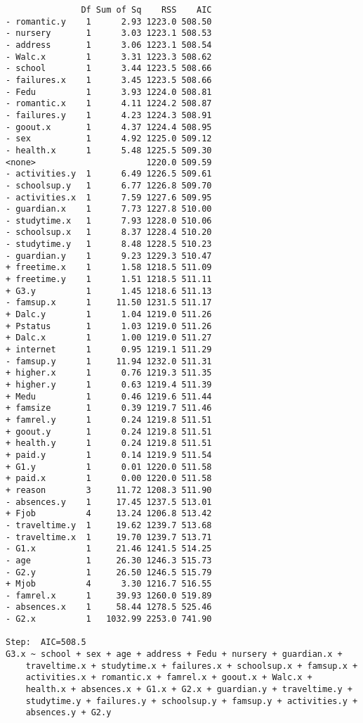 \documentclass[11pt]{article}
\begin{document}
\begin{enumerate}
\begin{verbatim}
               Df Sum of Sq    RSS    AIC
- romantic.y    1      2.93 1223.0 508.50
- nursery       1      3.03 1223.1 508.53
- address       1      3.06 1223.1 508.54
- Walc.x        1      3.31 1223.3 508.62
- school        1      3.44 1223.5 508.66
- failures.x    1      3.45 1223.5 508.66
- Fedu          1      3.93 1224.0 508.81
- romantic.x    1      4.11 1224.2 508.87
- failures.y    1      4.23 1224.3 508.91
- goout.x       1      4.37 1224.4 508.95
- sex           1      4.92 1225.0 509.12
- health.x      1      5.48 1225.5 509.30
<none>                      1220.0 509.59
- activities.y  1      6.49 1226.5 509.61
- schoolsup.y   1      6.77 1226.8 509.70
- activities.x  1      7.59 1227.6 509.95
- guardian.x    1      7.73 1227.8 510.00
- studytime.x   1      7.93 1228.0 510.06
- schoolsup.x   1      8.37 1228.4 510.20
- studytime.y   1      8.48 1228.5 510.23
- guardian.y    1      9.23 1229.3 510.47
+ freetime.x    1      1.58 1218.5 511.09
+ freetime.y    1      1.51 1218.5 511.11
+ G3.y          1      1.45 1218.6 511.13
- famsup.x      1     11.50 1231.5 511.17
+ Dalc.y        1      1.04 1219.0 511.26
+ Pstatus       1      1.03 1219.0 511.26
+ Dalc.x        1      1.00 1219.0 511.27
+ internet      1      0.95 1219.1 511.29
- famsup.y      1     11.94 1232.0 511.31
+ higher.x      1      0.76 1219.3 511.35
+ higher.y      1      0.63 1219.4 511.39
+ Medu          1      0.46 1219.6 511.44
+ famsize       1      0.39 1219.7 511.46
+ famrel.y      1      0.24 1219.8 511.51
+ goout.y       1      0.24 1219.8 511.51
+ health.y      1      0.24 1219.8 511.51
+ paid.y        1      0.14 1219.9 511.54
+ G1.y          1      0.01 1220.0 511.58
+ paid.x        1      0.00 1220.0 511.58
+ reason        3     11.72 1208.3 511.90
- absences.y    1     17.45 1237.5 513.01
+ Fjob          4     13.24 1206.8 513.42
- traveltime.y  1     19.62 1239.7 513.68
- traveltime.x  1     19.70 1239.7 513.71
- G1.x          1     21.46 1241.5 514.25
- age           1     26.30 1246.3 515.73
- G2.y          1     26.50 1246.5 515.79
+ Mjob          4      3.30 1216.7 516.55
- famrel.x      1     39.93 1260.0 519.89
- absences.x    1     58.44 1278.5 525.46
- G2.x          1   1032.99 2253.0 741.90

Step:  AIC=508.5
G3.x ~ school + sex + age + address + Fedu + nursery + guardian.x + 
    traveltime.x + studytime.x + failures.x + schoolsup.x + famsup.x + 
    activities.x + romantic.x + famrel.x + goout.x + Walc.x + 
    health.x + absences.x + G1.x + G2.x + guardian.y + traveltime.y + 
    studytime.y + failures.y + schoolsup.y + famsup.y + activities.y + 
    absences.y + G2.y


\end{verbatim}
\end{enumerate}
\end{document}

